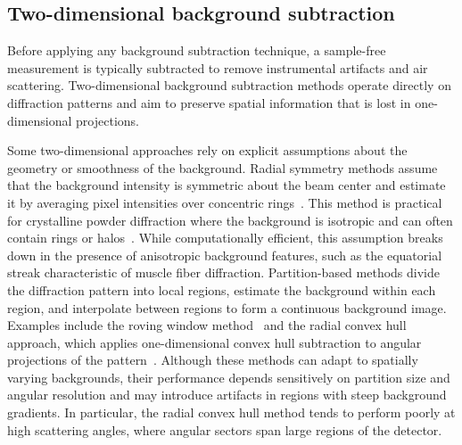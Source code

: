 \documentclass[11pt,onecolumn]{IEEEtran}
\begin{document}
\subsection{Two-dimensional background subtraction}

Before applying any background subtraction technique, a sample-free measurement is typically subtracted to remove instrumental artifacts and air scattering. Two-dimensional background subtraction methods operate directly on diffraction patterns and aim to preserve spatial information that is lost in one-dimensional projections.

Some two-dimensional approaches rely on explicit assumptions about the geometry or smoothness of the background. Radial symmetry methods assume that the background intensity is symmetric about the beam center and estimate it by averaging pixel intensities over concentric rings~\cite{rajkumar2007fibrefix}. This method is practical for crystalline powder diffraction where the background is isotropic and can often contain rings or halos~\cite{ashiotis2015pyfai}. While computationally efficient, this assumption breaks down in the presence of anisotropic background features, such as the equatorial streak characteristic of muscle fiber diffraction. Partition-based methods divide the diffraction pattern into local regions, estimate the background within each region, and interpolate between regions to form a continuous background image. Examples include the roving window method~\cite{HeEtAl2007} and the radial convex hull approach, which applies one-dimensional convex hull subtraction to angular projections of the pattern~\cite{lee2019musclex}. Although these methods can adapt to spatially varying backgrounds, their performance depends sensitively on partition size and angular resolution and may introduce artifacts in regions with steep background gradients. In particular, the radial convex hull method tends to perform poorly at high scattering angles, where angular sectors span large regions of the detector.
\end{document}
